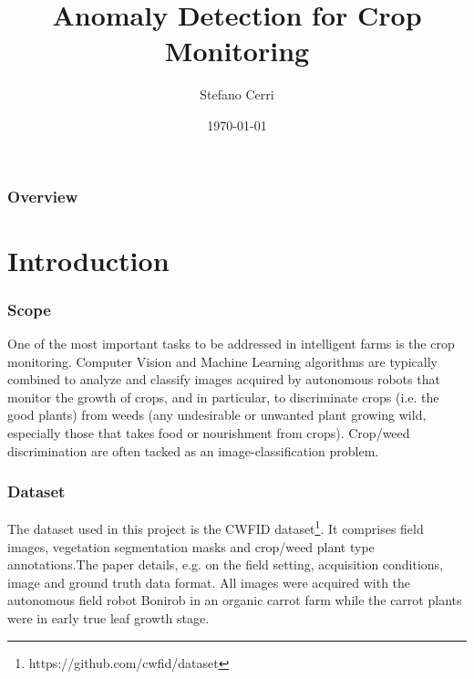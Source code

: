 \documentclass{beamer}
\title[Image Analysis Project]{Anomaly Detection for Crop Monitoring } %
\author{Stefano Cerri} %
\institute[Politecnico Di Milano] %
{
Politecnico di Milano \\ %
\medskip
\textit{stefano1.cerri@mail.polimi.it} %
}
\date{\today} %
\begin{document}
\begin{frame}
\titlepage %
\end{frame}

\begin{frame}
\frametitle{Overview} %
\tableofcontents %
\end{frame}


\section{Introduction} %

\begin{frame}
\frametitle{Scope}
One of the most important tasks to be addressed in intelligent farms is the crop monitoring. Computer Vision and Machine Learning algorithms are typically combined to analyze and classify images acquired by autonomous robots that monitor the growth of crops, and in particular, to discriminate crops (i.e. the good plants) from weeds (any undesirable or unwanted plant growing wild, especially those that takes food or nourishment from crops). Crop/weed discrimination are often tacked as an image-classification problem.
\end{frame}


\begin{frame}
\frametitle{Dataset}
The dataset used in this project is the CWFID dataset\footnote{https://github.com/cwfid/dataset}. It comprises field images, vegetation segmentation masks and crop/weed plant type annotations.The paper details, e.g. on the field setting, acquisition conditions, image and ground truth data format.
All images were acquired with the autonomous field robot Bonirob in an organic carrot farm while the carrot plants were in early true leaf growth stage.

\end{frame}
\end{document}
